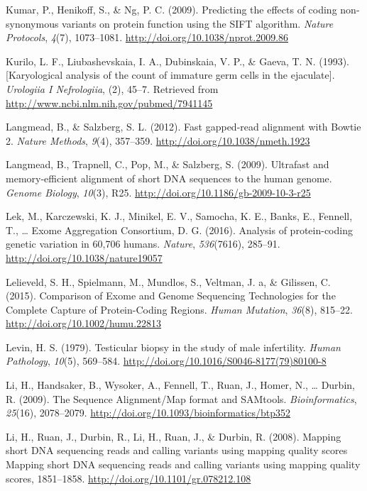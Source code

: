 \documentclass[12pt,twoside]{reedthesis}
\theoremstyle{definition}
\theoremstyle{definition}
\theoremstyle{remark}
\begin{document}
  \hypertarget{ref-Kumar2009}{}
  Kumar, P., Henikoff, S., \& Ng, P. C. (2009). Predicting the effects of
  coding non-synonymous variants on protein function using the SIFT
  algorithm. \emph{Nature Protocols}, \emph{4}(7), 1073--1081.
  \url{http://doi.org/10.1038/nprot.2009.86}
  
  \hypertarget{ref-Kurilo}{}
  Kurilo, L. F., Liubashevskaia, I. A., Dubinskaia, V. P., \& Gaeva, T. N.
  (1993). {[}Karyological analysis of the count of immature germ cells in
  the ejaculate{]}. \emph{Urologiia I Nefrologiia}, (2), 45--7. Retrieved
  from \url{http://www.ncbi.nlm.nih.gov/pubmed/7941145}
  
  \hypertarget{ref-Langmead2012}{}
  Langmead, B., \& Salzberg, S. L. (2012). Fast gapped-read alignment with
  Bowtie 2. \emph{Nature Methods}, \emph{9}(4), 357--359.
  \url{http://doi.org/10.1038/nmeth.1923}
  
  \hypertarget{ref-Langmead2009}{}
  Langmead, B., Trapnell, C., Pop, M., \& Salzberg, S. (2009). Ultrafast
  and memory-efficient alignment of short DNA sequences to the human
  genome. \emph{Genome Biology}, \emph{10}(3), R25.
  \url{http://doi.org/10.1186/gb-2009-10-3-r25}
  
  \hypertarget{ref-Lek2016}{}
  Lek, M., Karczewski, K. J., Minikel, E. V., Samocha, K. E., Banks, E.,
  Fennell, T., \ldots{} Exome Aggregation Consortium, D. G. (2016).
  Analysis of protein-coding genetic variation in 60,706 humans.
  \emph{Nature}, \emph{536}(7616), 285--91.
  \url{http://doi.org/10.1038/nature19057}
  
  \hypertarget{ref-Lelieveld2015}{}
  Lelieveld, S. H., Spielmann, M., Mundlos, S., Veltman, J. a, \&
  Gilissen, C. (2015). Comparison of Exome and Genome Sequencing
  Technologies for the Complete Capture of Protein-Coding Regions.
  \emph{Human Mutation}, \emph{36}(8), 815--22.
  \url{http://doi.org/10.1002/humu.22813}
  
  \hypertarget{ref-Levin1979}{}
  Levin, H. S. (1979). Testicular biopsy in the study of male infertility.
  \emph{Human Pathology}, \emph{10}(5), 569--584.
  \url{http://doi.org/10.1016/S0046-8177(79)80100-8}
  
  \hypertarget{ref-Li2009}{}
  Li, H., Handsaker, B., Wysoker, A., Fennell, T., Ruan, J., Homer, N.,
  \ldots{} Durbin, R. (2009). The Sequence Alignment/Map format and
  SAMtools. \emph{Bioinformatics}, \emph{25}(16), 2078--2079.
  \url{http://doi.org/10.1093/bioinformatics/btp352}
  
  \hypertarget{ref-Li2008}{}
  Li, H., Ruan, J., Durbin, R., Li, H., Ruan, J., \& Durbin, R. (2008).
  Mapping short DNA sequencing reads and calling variants using mapping
  quality scores Mapping short DNA sequencing reads and calling variants
  using mapping quality scores, 1851--1858.
  \url{http://doi.org/10.1101/gr.078212.108}
  
\end{document}
